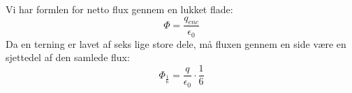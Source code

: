 Vi har formlen for netto flux gennem en lukket flade:
\begin{equation}
	\Phi = \frac{q_{enc}}{\epsilon _0}
\end{equation}
Da en terning er lavet af seks lige store dele, må fluxen gennem en side være en sjettedel af den samlede flux:
\begin{equation}
	\Phi_{\frac{1}{6}} = \frac{q}{\epsilon_0} \cdot \frac{1}{6}
\end{equation}